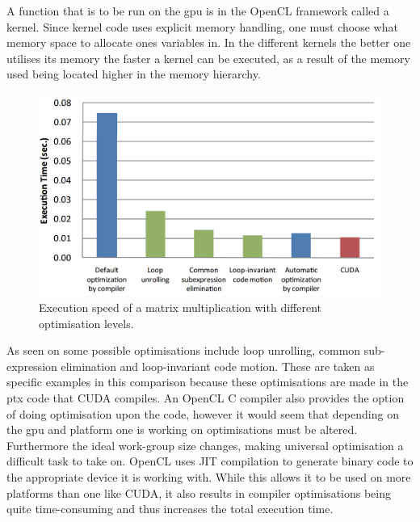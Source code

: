 A function that is to be run on the \acrshort{gpu} is in the OpenCL framework called a kernel.
Since kernel code uses explicit memory handling, one must choose what memory space to allocate ones variables in.
In the different kernels the better one utilises its memory the faster a kernel can be executed, as a result of the memory used being located higher in the memory hierarchy.
\begin{figure}[h!]
\centering
 \includegraphics[width=1\textwidth]{figures/opencloptimisation.png} %
\caption{Execution speed of a matrix multiplication with different optimisation levels. \citep{CUDAOpenCLOptimisation}}\label{image:OpenCLOptCompare}
\vspace{-15pt}
\end{figure}
As seen on  some possible optimisations include loop unrolling, common sub-expression elimination and loop-invariant code motion. 
These are taken as specific examples in this comparison because these optimisations are made in the \acrlong{ptx} code that CUDA compiles.
An OpenCL C compiler also provides the option of doing optimisation upon the code, however it would seem that depending on the \acrshort{gpu} and platform one is working on optimisations must be altered.
Furthermore the ideal work-group size changes, making universal optimisation a difficult task to take on.
OpenCL uses JIT compilation to generate binary code to the appropriate device it is working with.
While this allows it to be used on more platforms than one like CUDA, it also results in compiler optimisations being quite time-consuming and thus increases the total execution time.\citep{CUDAOpenCLOptimisation}